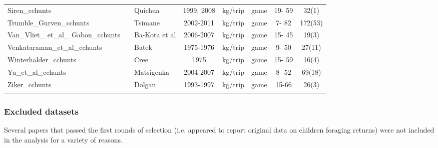 \begin{landscape}
\begin{longtable}{M{2.6cm} M{3.6cm} M{1.5cm} c c M{1cm} c c}
Siren\_cchunts                 & \cite{siren_effects_2016}                 & Quichua         & 1999, 2008 & kg/trip   & game               & 19- 59  & 32(1)      \\%
Trumble\_Gurven\_cchunts        & \cite{gurven_how_2006}                    & Tsimane         & 2002-2011  & kg/trip   & game               & 7- 82   & 172(53)    \\%
Van\_Vliet\_ et\_al\_ Gabon\_cchunts & \cite{van_vliet_hunting_2008}             & Ba-Kota et al   & 2006-2007  & kg/trip   & game               & 15- 45  & 19(3)      \\%
Venkataraman\_et\_al\_cchunts    & \cite{endicott_hunting_1979}              & Batek           & 1975-1976  & kg/trip   & game               & 9- 50   & 27(11)     \\%
Winterhalder\_cchunts          & \cite{winterhalder_boreal_1983}           & Cree            & 1975       & kg/trip   & game               & 15- 59  & 16(4)     \\%
Yu\_et\_al\_cchunts              & \cite{ohl-schacherer_sustainability_2007} & Matsigenka      & 2004-2007  & kg/trip   & game               & 8- 52   & 69(18)   \\%
Ziker\_cchunts                 & \cite{ziker_peoples_2002}                 & Dolgan          & 1993-1997 & kg/trip   & game               & 15-66  & 26(3)     \\ %
\renewcommand{\tablename}{Table S}
\label{tab:metadata}
\end{longtable}
\end{landscape}


\subsubsection{Excluded datasets} \label{SI:excluded}

Several papers that passed the first rounds of selection (i.e. appeared to report original data on children foraging returns) were not included in the analysis for a variety of reasons. 

